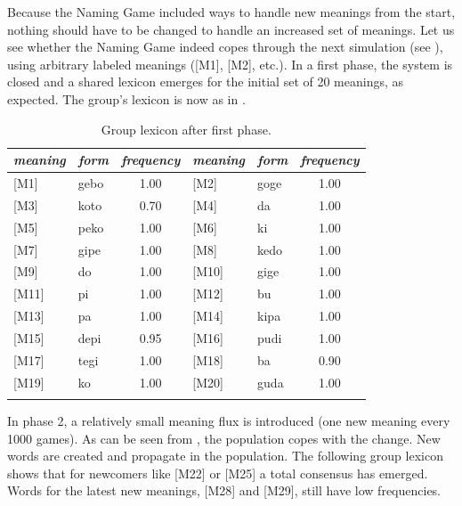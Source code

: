 Because the Naming Game included ways to 
handle new meanings from the start, nothing should 
have to be changed to handle an increased set of meanings. 
Let us see whether the Naming Game indeed copes
through the next simulation (see ), using 
arbitrary labeled meanings ([M1], [M2], etc.). 
In a first phase, the system is closed 
and a shared lexicon emerges for the initial set 
of 20 meanings, as expected. The group's lexicon
is now as in . 
\begin{table}
\begin{center}
\begin{tabular}{l  l  c  l  l  c } \lsptoprule 
{\itshape meaning} & {\itshape form} & {\itshape frequency} & {\itshape meaning} & {\itshape form} & {\itshape frequency}\\ \midrule 
{}[M1]& gebo & 1.00 & [M2]& goge & 1.00 \\  
{}[M3]& koto & 0.70 & [M4]& da & 1.00 \\  
{}[M5]& peko & 1.00 & [M6]& ki & 1.00 \\  
{}[M7]& gipe & 1.00 & [M8]& kedo & 1.00 \\  
{}[M9]& do & 1.00 & [M10]& gige & 1.00 \\  
{}[M11]& pi & 1.00 & [M12]& bu & 1.00 \\  
{}[M13]& pa & 1.00 & [M14]& kipa & 1.00 \\  
{}[M15]& depi & 0.95 & [M16]& pudi & 1.00 \\  
{}[M17]& tegi & 1.00 & [M18]& ba & 0.90 \\  
{}[M19]& ko & 1.00 & [M20]& guda & 1.00 \\  
 \lspbottomrule
\end{tabular}
\caption{\label{tab:gphase1} Group lexicon after first phase.}
\end{center}
\end{table}
In phase 2, a relatively small meaning flux is introduced (one
new meaning every 1000 games). As can 
be seen from , 
the population copes with the change. New words are created and 
propagate in the population. The following group lexicon
shows that for newcomers like [M22] or [M25] a total 
consensus has emerged. Words for the latest
new meanings, [M28] and [M29], still have low frequencies. 
